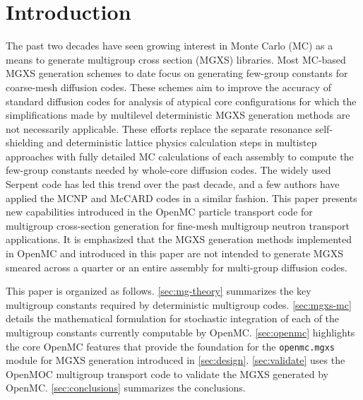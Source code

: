 \section{Introduction}
\label{sec:intro}

The past two decades have seen growing interest in Monte Carlo (MC) as a means to generate multigroup cross section (MGXS) libraries. Most MC-based MGXS generation schemes to date focus on generating few-group constants for coarse-mesh diffusion codes. These schemes aim to improve the accuracy of standard diffusion codes for analysis of atypical core configurations for which the simplifications made by multilevel deterministic MGXS generation methods are not necessarily applicable. These efforts replace the separate resonance self-shielding and deterministic lattice physics calculation steps in multistep approaches with fully detailed MC calculations of each assembly to compute the few-group constants needed by whole-core diffusion codes. The widely used Serpent code\cite{leppanen2015serpent} has led this trend over the past decade, and a few authors have applied the MCNP\cite{pounders2006stochastically} and McCARD\cite{shim2008generation} codes in a similar fashion. This paper presents new capabilities introduced in the OpenMC\cite{romano2015openmc} particle transport code for multigroup cross-section generation for fine-mesh multigroup neutron transport applications. It is emphasized that the MGXS generation methods implemented in OpenMC and introduced in this paper are not intended to generate MGXS smeared across a quarter or an entire assembly for multi-group diffusion codes.

This paper is organized as follows. \cref{sec:mg-theory} summarizes the key multigroup constants required by deterministic multigroup codes. \cref{sec:mgxs-mc} details the mathematical formulation for stochastic integration of each of the multigroup constants currently computable by OpenMC. \cref{sec:openmc} highlights the core OpenMC features that provide the foundation for the \texttt{openmc.mgxs} module for MGXS generation introduced in \cref{sec:design}. \cref{sec:validate} uses the OpenMOC\cite{boyd2014openmoc} multigroup transport code to validate the MGXS generated by OpenMC. \cref{sec:conclusions} summarizes the conclusions.
